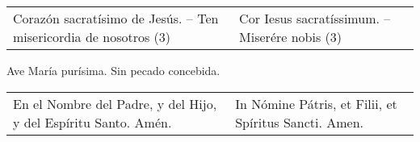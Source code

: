\documentclass[./rosary.tex]{subfiles}
\begin{document}
\begin{longtable} { p{} p{} }
    Corazón sacratísimo de Jesús. -- Ten misericordia de nosotros (3)
    
     &

    Cor Iesus sacratíssimum. -- Miserére nobis (3)
\end{longtable}

\begin{center}
    Ave María purísima. Sin pecado concebida.
\end{center}

\begin{longtable} { p{} p{} }
    En el Nombre del Padre, y del Hijo, y del Espíritu Santo. Amén.

     &

    In Nómine Pátris, et Filii, et Spíritus Sancti. Amen.
\end{longtable}
\end{document}

